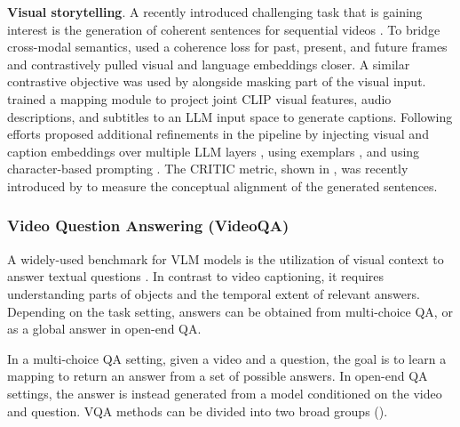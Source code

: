 \noindent
\textbf{Visual storytelling}. A recently introduced challenging task that is gaining interest is the generation of coherent sentences for sequential videos \citep{li2019video}. To bridge cross-modal semantics, \citet{yu2021transitional} used a coherence loss for past, present, and future frames and contrastively pulled visual and language embeddings closer. A similar contrastive objective was used by \citep{xiao2022hierarchical} alongside masking part of the visual input. \citet{han2023autoad} trained a mapping module to project joint CLIP visual features, audio descriptions, and subtitles to an LLM input space to generate captions. Following efforts proposed additional refinements in the pipeline by injecting visual and caption embeddings over multiple LLM layers \citep{han2023autoadii}, using exemplars \citep{han2024autoadiii}, and using character-based prompting \citep{xie2024autoad}. The CRITIC metric, shown in , was recently introduced by \citet{han2024autoadiii} to measure the conceptual alignment of the generated sentences.




\subsubsection{Video Question Answering (VideoQA)}

A widely-used benchmark for VLM models is the utilization of visual context to answer textual questions \citep{antol2015vqa,goyal2017making}. In contrast to video captioning, it requires understanding parts of objects and the temporal extent of relevant answers. Depending on the task setting, answers can be obtained from multi-choice QA, or as a global answer in open-end QA. 

In a multi-choice QA setting, given a video and a question, the goal is to learn a mapping to return an answer from a set of possible answers. In open-end QA settings, the answer is instead generated from a model conditioned on the video and question. VQA methods can be divided into two broad groups ().

